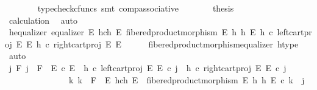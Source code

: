 \begin{isabellebody}
\ \ \ \ \ \ \isamarkupfalse%
\ {\isacharparenleft}{\kern0pt}typecheck{\isacharunderscore}{\kern0pt}cfuncs{\isacharcomma}{\kern0pt}\ smt\ comp{\isacharunderscore}{\kern0pt}associative{}{\isacharparenright}{\kern0pt}\isanewline
\ \ \ \ \isamarkupfalse%
\ \isamarkupfalse%
\ {\isacharquery}{\kern0pt}thesis\isanewline
\ \ \ \ \ \ \isamarkupfalse%
\ calculation\ \isamarkupfalse%
\ auto\isanewline
\ \ \isamarkupfalse%
\isanewline
\ \ \isamarkupfalse%
\ h{\isacharunderscore}{\kern0pt}equalizer{\isacharcolon}{\kern0pt}\ {\isachardoublequoteopen}equalizer\ {\isacharparenleft}{\kern0pt}E\ \isactrlbsub h\isactrlesub {\isasymtimes}\isactrlsub c\isactrlbsub h\isactrlesub \ E{\isacharparenright}{\kern0pt}\ {\isacharparenleft}{\kern0pt}fibered{\isacharunderscore}{\kern0pt}product{\isacharunderscore}{\kern0pt}morphism\ E\ h\ h\ E{\isacharparenright}{\kern0pt}\ {\isacharparenleft}{\kern0pt}h\ {\isasymcirc}\isactrlsub c\ left{\isacharunderscore}{\kern0pt}cart{\isacharunderscore}{\kern0pt}proj\ E\ E{\isacharparenright}{\kern0pt}\ {\isacharparenleft}{\kern0pt}h\ {\isasymcirc}\isactrlsub c\ right{\isacharunderscore}{\kern0pt}cart{\isacharunderscore}{\kern0pt}proj\ E\ E{\isacharparenright}{\kern0pt}{\isachardoublequoteclose}\isanewline
\ \ \ \ \isamarkupfalse%
\ fibered{\isacharunderscore}{\kern0pt}product{\isacharunderscore}{\kern0pt}morphism{\isacharunderscore}{\kern0pt}equalizer\ h{\isacharunderscore}{\kern0pt}type\ \isamarkupfalse%
\ auto\isanewline
\ \ \isamarkupfalse%
\ \isamarkupfalse%
\ {\isachardoublequoteopen}{\isasymforall}j\ F{\isachardot}{\kern0pt}\ j\ {\isacharcolon}{\kern0pt}\ F\ {\isasymrightarrow}\ E\ {\isasymtimes}\isactrlsub c\ E\ {\isasymand}\ {\isacharparenleft}{\kern0pt}h\ {\isasymcirc}\isactrlsub c\ left{\isacharunderscore}{\kern0pt}cart{\isacharunderscore}{\kern0pt}proj\ E\ E{\isacharparenright}{\kern0pt}\ {\isasymcirc}\isactrlsub c\ j\ {\isacharequal}{\kern0pt}\ {\isacharparenleft}{\kern0pt}h\ {\isasymcirc}\isactrlsub c\ right{\isacharunderscore}{\kern0pt}cart{\isacharunderscore}{\kern0pt}proj\ E\ E{\isacharparenright}{\kern0pt}\ {\isasymcirc}\isactrlsub c\ j\ {\isasymlongrightarrow}\isanewline
\ \ \ \ \ \ \ \ \ \ \ \ \ \ \ {\isacharparenleft}{\kern0pt}{\isasymexists}{\isacharbang}{\kern0pt}k{\isachardot}{\kern0pt}\ k\ {\isacharcolon}{\kern0pt}\ F\ {\isasymrightarrow}\ E\ \isactrlbsub h\isactrlesub {\isasymtimes}\isactrlsub c\isactrlbsub h\isactrlesub \ E\ {\isasymand}\ fibered{\isacharunderscore}{\kern0pt}product{\isacharunderscore}{\kern0pt}morphism\ E\ h\ h\ E\ {\isasymcirc}\isactrlsub c\ k\ {\isacharequal}{\kern0pt}\ j{\isacharparenright}{\kern0pt}{\isachardoublequoteclose}\isanewline

\end{isabellebody}
